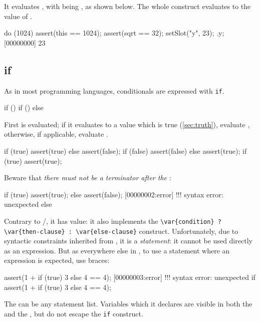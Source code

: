 It evaluates , with \this being , as
shown below.  The whole construct evaluates to the value
of .

\begin{urbiscript}
do (1024)
{
  assert(this == 1024);
  assert(sqrt == 32);
  setSlot("y", 23);
}.y;
[00000000] 23
\end{urbiscript}


\subsection{if}
\label{sec:lang:if}
As in most programming languages, conditionals are expressed with
\lstinline|if|.

\begin{urbiunchecked}
if () 
if ()  else 
\end{urbiunchecked}

First  is evaluated; if it evaluates to a value which
is true (\autoref{sec:truth}), evaluate , otherwise,
if applicable, evaluate .

\begin{urbiscript}
if (true) assert(true) else assert(false);
if (false) assert(false) else assert(true);
if (true) assert(true);
\end{urbiscript}

Beware that \emph{there must not be a terminator after the
  }:

\begin{urbiscript}
if (true)
  assert(true);
else
  assert(false);
[00000002:error] !!! syntax error: unexpected else
\end{urbiscript}

Contrary to \C/\Cxx, it has value: it also implements the
\lstinline|\var{condition} ? \var{then-clause} : \var{else-clause}|
construct.  Unfortunately, due to syntactic constraints inherited from
\C, it is a \emph{statement}: it cannot be used directly as an
expression.  But as everywhere else in \us, to use a statement where
an expression is expected, use braces:

\begin{urbiscript}
assert(1 + if (true) 3 else 4 == 4);
[00000003:error] !!! syntax error: unexpected if
assert(1 + { if (true) 3 else 4 } == 4);
\end{urbiscript}

The  can be any statement list.  Variables which it
declares are visible in both the  and the
, but do not escape the \lstinline|if| construct.

